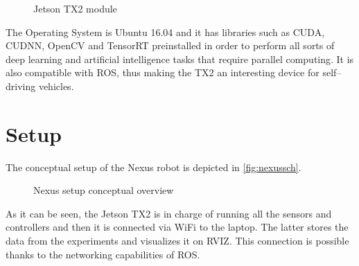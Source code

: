 \begin{figure}[htb]
  \centering
  \caption{Jetson TX2 module}
  \label{fig:tx2}
\end{figure}

The Operating System is Ubuntu 16.04 and it has libraries such as CUDA, CUDNN, OpenCV and TensorRT preinstalled in order to perform all sorts of deep learning and artificial intelligence tasks that require parallel computing. It is also compatible with ROS, thus making the TX2 an interesting device for self--driving vehicles.

\section{Setup}
The conceptual setup of the Nexus robot is depicted in \autoref{fig:nexussch}.
\begin{figure}[htb]
  \centering
  \caption{Nexus setup conceptual overview}
  \label{fig:nexussch}
\end{figure}  

As it can be seen, the Jetson TX2 is in charge of running all the sensors and controllers and then it is connected via WiFi to the laptop. The latter stores the data from the experiments and visualizes it on RVIZ. This connection is possible thanks to the networking capabilities of ROS.


